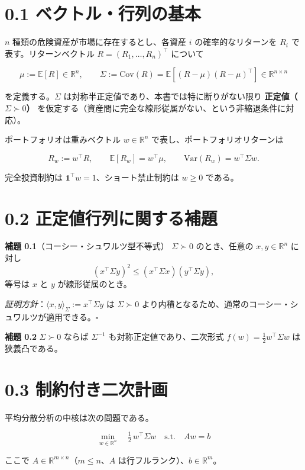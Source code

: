 \documentclass[11pt,a4paper]{report}
\begin{document}
\section{0.1 ベクトル・行列の基本}

$n$ 種類の危険資産が市場に存在するとし、各資産 $i$ の確率的なリターンを $R_i$ で表す。リターンベクトル $R = (R_1, \dots, R_n)^\top$ について

\[ \mu := \mathbb{E}[R] \in \mathbb{R}^n, \qquad \Sigma := \mathrm{Cov}(R) = \mathbb{E}[(R-\mu)(R-\mu)^\top] \in \mathbb{R}^{n\times n} \]

を定義する。$\Sigma$ は対称半正定値であり、本書では特に断りがない限り \textbf{正定値（$\Sigma \succ 0$）} を仮定する（資産間に完全な線形従属がない、という非縮退条件に対応）。

ポートフォリオは重みベクトル $w \in \mathbb{R}^n$ で表し、ポートフォリオリターンは

\[ R_w := w^\top R, \qquad \mathbb{E}[R_w] = w^\top \mu, \qquad \mathrm{Var}(R_w) = w^\top \Sigma w. \]

完全投資制約は $\mathbf{1}^\top w = 1$、ショート禁止制約は $w \ge 0$ である。

\section{0.2 正定値行列に関する補題}

\textbf{補題 0.1}（コーシー・シュワルツ型不等式） $\Sigma \succ 0$ のとき、任意の $x, y \in \mathbb{R}^n$ に対し \[ (x^\top \Sigma y)^2 \le (x^\top \Sigma x)(y^\top \Sigma y), \] 等号は $x$ と $y$ が線形従属のとき。

\emph{証明方針}：$\langle x, y\rangle_\Sigma := x^\top \Sigma y$ は $\Sigma \succ 0$ より内積となるため、通常のコーシー・シュワルツが適用できる。$\square$

\textbf{補題 0.2} $\Sigma \succ 0$ ならば $\Sigma^{-1}$ も対称正定値であり、二次形式 $f(w) = \tfrac{1}{2} w^\top \Sigma w$ は狭義凸である。

\section{0.3 制約付き二次計画}

平均分散分析の中核は次の問題である。

\[ \min_{w \in \mathbb{R}^n} \quad \tfrac{1}{2}\, w^\top \Sigma w \quad \text{s.t.} \quad A w = b \]

ここで $A \in \mathbb{R}^{m \times n}$（$m \le n$、$A$ は行フルランク）、$b \in \mathbb{R}^m$。
\end{document}
